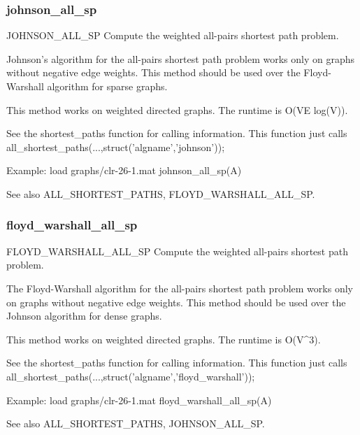 \subsubsection*{johnson\_all\_sp}
\begin{mcode}
  JOHNSON_ALL_SP Compute the weighted all-pairs shortest path problem.
 
  Johnson's algorithm for the all-pairs shortest path problem 
  works only on graphs without negative edge weights.  This method should
  be used over the Floyd-Warshall algorithm for sparse graphs.  
 
  This method works on weighted directed graphs.
  The runtime is O(VE log(V)).
 
  See the shortest_paths function for calling information.  This function 
  just calls all_shortest_paths(...,struct('algname','johnson'));
 
  Example:
     load graphs/clr-26-1.mat
     johnson_all_sp(A)
 
  See also ALL_SHORTEST_PATHS, FLOYD_WARSHALL_ALL_SP.
\end{mcode}
\newpage
\subsubsection*{floyd\_warshall\_all\_sp}
\begin{mcode}
  FLOYD_WARSHALL_ALL_SP Compute the weighted all-pairs shortest path problem.
 
  The Floyd-Warshall algorithm for the all-pairs shortest path problem 
  works only on graphs without negative edge weights.  This method should
  be used over the Johnson algorithm for dense graphs.  
 
  This method works on weighted directed graphs.
  The runtime is O(V^3).
 
  See the shortest_paths function for calling information.  This function 
  just calls all_shortest_paths(...,struct('algname','floyd_warshall'));
 
  Example:
     load graphs/clr-26-1.mat
     floyd_warshall_all_sp(A)
 
  See also ALL_SHORTEST_PATHS, JOHNSON_ALL_SP.
\end{mcode}
\newpage
